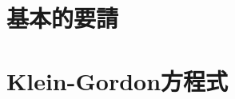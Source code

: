 \documentclass{report}
\begin{document}
  \chapter{基本的要請}
    
  \chapter{Klein-Gordon方程式}
\end{document}
